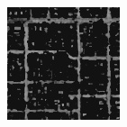 \documentclass[usenames,dvipsnames,10pt]{beamer}
\begin{document}
\begin{frame}
\begin{minipage}[]{0.3\textwidth}
\includegraphics[width=\textwidth]{graphics/tfcn-output-01.jpg}
\end{minipage}
\end{frame}
\end{document}

